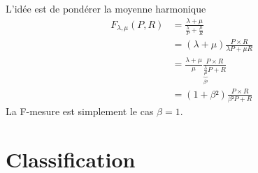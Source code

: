 \documentclass[../allslides.tex]{subfiles}
\begin{document}
\begin{frame}[fragile=singleslide]
	L'idée est de pondérer la moyenne harmonique
	\begin{align}
		F_{λ, μ}(P, R)
			&= \frac{λ+μ}{\frac{λ}{P}+\frac{μ}{R}}\\
			&= (λ+μ) \frac{P×R}{λP + μR}\\
			&= \frac{λ+μ}{μ} \frac{P×R}{\underbrace{\frac{λ}{μ}}_{β²}P + R}\\
			&= (1+β²)\frac{P×R}{β²P + R}
	\end{align}
	La F-mesure est simplement le cas $β=1$.
\end{frame}



\section{Classification}
\end{document}
